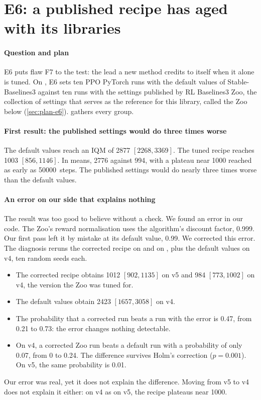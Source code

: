 \section{E6: a published recipe has aged with its libraries}\label{sec:e6}

\paragraph{Question and plan}
E6 puts flaw F7 to the test: the lead a new method credits to itself when it alone is tuned. On
, E6 sets ten PPO PyTorch runs with the default values of Stable-Baselines3 against ten runs
with the settings published by RL Baselines3 Zoo, the collection of settings that serves as the reference
for this library, called the Zoo below (\cref{sec:plan-e6}).  gathers every group.


\paragraph{First result: the published settings would do three times worse}
The default values reach an IQM of \num{2877} $[\num{2268}, \num{3369}]$. The tuned recipe reaches
\num{1003} $[856, \num{1146}]$. In means, \num{2776} against 994, with a plateau near \num{1000} reached as
early as \num{50000}~steps. The published settings would do nearly three times worse than the default values.

\paragraph{An error on our side that explains nothing}
The result was too good to believe without a check. We found an error in our code. The Zoo's reward
normalisation uses the algorithm's discount factor, 0.999. Our first pass left it by mistake at its default value,
0.99. We corrected this error. The diagnosis reruns the corrected recipe on
 and on , plus the default values on v4, ten random seeds each.
\begin{itemize}
  \item The corrected recipe obtains \num{1012} $[902, \num{1135}]$ on v5 and \num{984} $[773, \num{1002}]$ on
    v4, the version the Zoo was tuned for.
  \item The default values obtain \num{2423} $[\num{1657}, \num{3058}]$ on v4.
  \item The probability that a corrected run beats a run with the error is 0.47, from 0.21 to 0.73: the error
    changes nothing detectable.
  \item On v4, a corrected Zoo run beats a default run with a probability of only 0.07, from 0 to 0.24. The
    difference survives Holm's correction ($p=0.001$). On v5, the same probability is 0.01.
\end{itemize}
Our error was real, yet it does not explain the difference. Moving from v5 to v4 does not explain it either:
on v4 as on v5, the recipe plateaus near \num{1000}.

